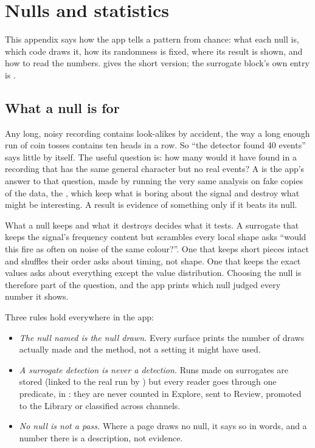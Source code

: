 \chapter{Nulls and statistics}\label{app:nulls}
This appendix says how the app tells a pattern from chance: what each null is, which code
draws it, how its randomness is fixed, where its result is shown, and how to read the numbers.
 gives the short version; the surrogate block's own entry is
.

\section{What a null is for}\label{sec:nulls-what}
\begin{plainterms}
Any long, noisy recording contains look-alikes by accident, the way a long enough run of coin
tosses contains ten heads in a row. So ``the detector found 40 events'' says little by itself.
The useful question is: how many would it have found in a recording that has the same general
character but no real events? A  is the app's answer to that question, made
by running the very same analysis on fake copies of the data, the
, which keep what is boring about the signal and destroy what might
be interesting. A result is evidence of something only if it beats its null.
\end{plainterms}

What a null keeps and what it destroys decides what it tests. A surrogate that keeps the
signal's frequency content but scrambles every local shape asks ``would this fire as often on
noise of the same colour?''. One that keeps short pieces intact and shuffles their order asks
about timing, not shape. One that keeps the exact values asks about everything except the
value distribution. Choosing the null is therefore part of the question, and the app prints
which null judged every number it shows.

Three rules hold everywhere in the app:
\begin{itemize}
\item \emph{The null named is the null drawn.} Every surface prints the number of draws
  actually made and the method, not a setting it might have used.
\item \emph{A surrogate detection is never a detection.} Runs made on surrogates are stored
  (linked to the real run by ) but every reader goes through
  one predicate,  in : they are never
  counted in Explore, sent to Review, promoted to the Library or classified across channels.
\item \emph{No null is not a pass.} Where a page draws no null, it says so in words, and a
  number there is a description, not evidence.
\end{itemize}

